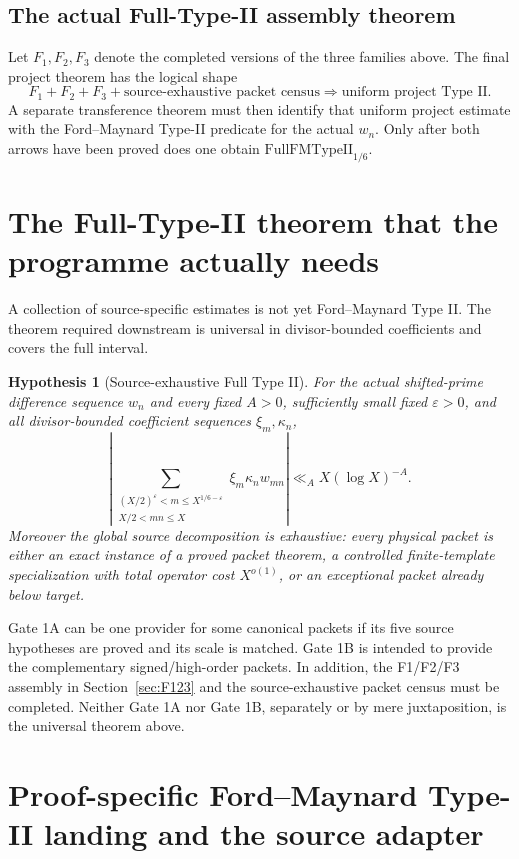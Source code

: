 \documentclass[11pt]{article}
\newtheorem{hypothesis}[theorem]{Hypothesis}
\theoremstyle{definition}
\theoremstyle{remark}
\newcommand{\FullFM}{\mathrm{FullFMTypeII}_{1/6}}
\newcommand{\1}{\mathbf 1}
\begin{document}
\subsection{The actual Full-Type-II assembly theorem}

Let $F_1,F_2,F_3$ denote the completed versions of the three families above.  The final project theorem has the
logical shape
\[
 \boxed{
 F_1+F_2+F_3
 +\text{source-exhaustive packet census}
 \Longrightarrow \text{uniform project Type II}.}
\tag{F123-assemble}
\]
A separate transference theorem must then identify that uniform project estimate with the Ford--Maynard Type-II
predicate for the actual $w_n$.  Only after both arrows have been proved does one obtain $\FullFM$.


\section{The Full-Type-II theorem that the programme actually needs}

A collection of source-specific estimates is not yet Ford--Maynard Type II.  The theorem required downstream is
universal in divisor-bounded coefficients and covers the full interval.

\begin{hypothesis}[Source-exhaustive Full Type II]\label{hyp:FullFM}
For the actual shifted-prime difference sequence $w_n$ and every fixed $A>0$, sufficiently small fixed
$\varepsilon>0$, and all divisor-bounded coefficient sequences $\xi_m,\kappa_n$,
\[
 \boxed{
 \left|\sum_{\substack{(X/2)^\varepsilon<m\le X^{1/6-\varepsilon}\\X/2<mn\le X}}
 \xi_m\kappa_n w_{mn}\right|
 \ll_A X(\log X)^{-A}.}
\tag{FullFM}
\]
Moreover the global source decomposition is exhaustive: every physical packet is either an exact instance of a
proved packet theorem, a controlled finite-template specialization with total operator cost $X^{o(1)}$, or an
exceptional packet already below target.
\end{hypothesis}

Gate 1A can be one provider for some canonical packets if its five source hypotheses are proved and its scale
is matched.  Gate 1B is intended to provide the complementary signed/high-order packets.  In addition, the
F1/F2/F3 assembly in Section~\ref{sec:F123} and the source-exhaustive packet census must be completed.  Neither
Gate 1A nor Gate 1B, separately or by mere juxtaposition, is the universal theorem above.


\section{Proof-specific Ford--Maynard Type-II landing and the source adapter}
\label{sec:fm-structured}
\end{document}
